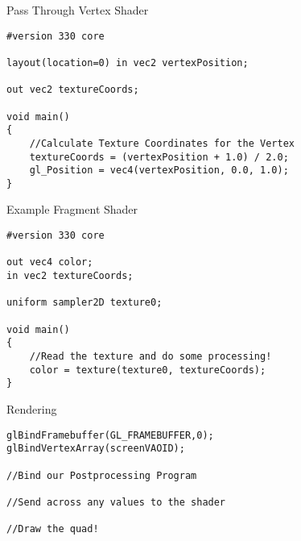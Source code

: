 \begin{frame}[fragile]{Pass Through Vertex Shader}
	\begin{lstlisting}
#version 330 core

layout(location=0) in vec2 vertexPosition;

out vec2 textureCoords;

void main()
{
	//Calculate Texture Coordinates for the Vertex
	textureCoords = (vertexPosition + 1.0) / 2.0;
	gl_Position = vec4(vertexPosition, 0.0, 1.0);
}
	\end{lstlisting}
\end{frame}

\begin{frame}[fragile]{Example Fragment Shader}
	\begin{lstlisting}
#version 330 core

out vec4 color;
in vec2 textureCoords;

uniform sampler2D texture0;

void main()
{
	//Read the texture and do some processing!
	color = texture(texture0, textureCoords);
}
	\end{lstlisting}
\end{frame}

\begin{frame}[fragile]{Rendering}
	\begin{lstlisting}
glBindFramebuffer(GL_FRAMEBUFFER,0);
glBindVertexArray(screenVAOID);

//Bind our Postprocessing Program

//Send across any values to the shader

//Draw the quad!
	\end{lstlisting}
\end{frame}